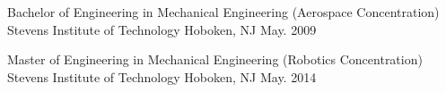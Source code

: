 
\begin{cventries}

  \cvedu
    {Bachelor of Engineering in Mechanical Engineering (Aerospace Concentration)} %
    {Stevens Institute of Technology} %
    {Hoboken, NJ} %
    {May. 2009} %
    { } %

  \cvedu
    {Master of Engineering in Mechanical Engineering (Robotics Concentration)} %
    {Stevens Institute of Technology} %
    {Hoboken, NJ} %
    {May. 2014} %
    { } %
\end{cventries}
